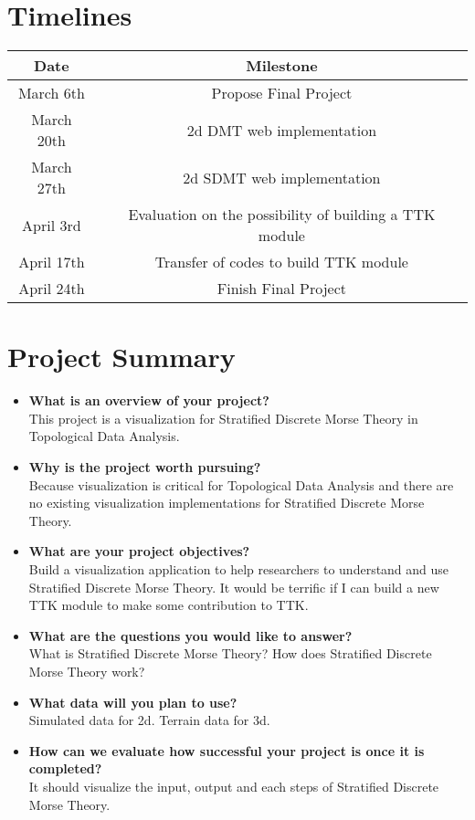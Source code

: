 \documentclass[12pt]{article}
\begin{document}
\section{Timelines}
\begin{table}[h]
\centering
\begin{tabular}{c|c}
Date&Milestone\\
\hline \hline
March 6th&Propose Final Project\\
\hline
March 20th&2d DMT web implementation\\
\hline
March 27th&2d SDMT web implementation\\
\hline
April 3rd&Evaluation on the possibility of building a TTK module\\
\hline
April 17th&Transfer of codes to build TTK module\\
\hline
April 24th&Finish Final Project
\end{tabular}
\end{table}

\section{Project Summary}
\begin{itemize}
\item \textbf{What is an overview of your project?}\\
This project is a visualization for Stratified Discrete Morse Theory in Topological Data Analysis.
\item \textbf{Why is the project worth pursuing?}\\
Because visualization is critical for Topological Data Analysis and there are no existing visualization implementations for Stratified Discrete Morse Theory.
\item \textbf{What are your project objectives?}\\
Build a visualization application to help researchers to understand and use Stratified Discrete Morse Theory. It would be terrific if I can build a new TTK module to make some contribution to TTK.
\item \textbf{What are the questions you would like to answer?}\\
What is Stratified Discrete Morse Theory? How does Stratified Discrete Morse Theory work?
\item \textbf{What data will you plan to use?}\\
Simulated data for 2d. Terrain data for 3d.
\item \textbf{How can we evaluate how successful your project is once it is completed?}\\
It should visualize the input, output and each steps of Stratified Discrete Morse Theory.
\end{itemize}
\end{document}
